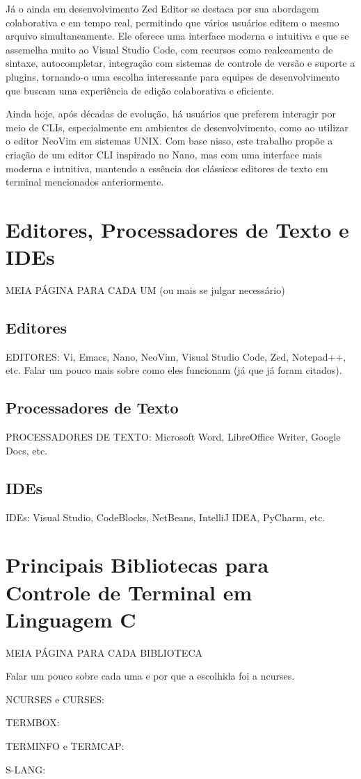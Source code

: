 Já o ainda em desenvolvimento Zed Editor se destaca por sua abordagem colaborativa e em tempo real, permitindo que vários usuários editem o mesmo
arquivo simultaneamente. Ele oferece uma interface moderna e intuitiva e que se assemelha muito ao Visual Studio Code, com recursos como realceamento de sintaxe,
autocompletar, integração com sistemas de controle de versão e suporte a plugins, tornando-o uma escolha interessante para equipes de desenvolvimento que buscam
uma experiência de edição colaborativa e eficiente.

Ainda hoje, após décadas de evolução, há usuários que preferem interagir por meio de CLIs, especialmente em ambientes de desenvolvimento, como ao utilizar o
editor NeoVim em sistemas UNIX. Com base nisso, este trabalho propõe a criação de um editor CLI inspirado no Nano, mas com uma interface mais moderna e
intuitiva, mantendo a essência dos clássicos editores de texto em terminal mencionados anteriormente.

\section{Editores, Processadores de Texto e IDEs}

MEIA PÁGINA PARA CADA UM (ou mais se julgar necessário)

\subsection{Editores}

EDITORES: Vi, Emacs, Nano, NeoVim, Visual Studio Code, Zed, Notepad++, etc. Falar um pouco mais sobre como eles funcionam (já que já foram citados).

\subsection{Processadores de Texto}
PROCESSADORES DE TEXTO: Microsoft Word, LibreOffice Writer, Google Docs, etc.

\subsection{IDEs}

IDEs: Visual Studio, CodeBlocks, NetBeans, IntelliJ IDEA, PyCharm, etc.

\section{Principais Bibliotecas para Controle de Terminal em Linguagem C}

MEIA PÁGINA PARA CADA BIBLIOTECA

Falar um pouco sobre cada uma e por que a escolhida foi a ncurses.

NCURSES e CURSES:

TERMBOX:

TERMINFO e TERMCAP:

S-LANG:
